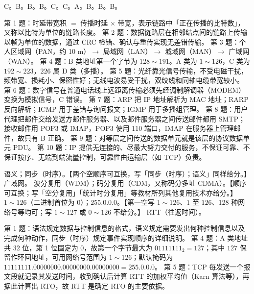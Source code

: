 \documentclass[a4paper,11pt]{article}
\begin{document}

\setcounter{question}{0}
\q C。\quad \q B。\quad \q B。\quad \q B。\quad \q C。\quad \q C。\quad \q A。\quad \q B。\quad \q B。\quad \q B。
\begin{analysis}
第 1 题：时延带宽积 \(=\) 传播时延 \(\times\) 带宽，表示链路中「正在传播的比特数」，又称以比特为单位的链路长度。
第 2 题：数据链路层在相邻结点间的链路上传输以帧为单位的数据，通过 CRC 检错、确认与重传实现无差错传输。
第 3 题：个人区域网（PAN，约 10 m）\(\rightarrow\) 局域网（LAN）\(\rightarrow\) 城域网（MAN）\(\rightarrow\) 广域网（WAN）。
第 4 题：B 类地址第一个字节为 \(128\sim191\)。A 类为 \(1\sim126\)，C 类为 \(192\sim223\)，\(226\) 属 D 类（多播）。
第 5 题：光纤靠光信号传输，不受电磁干扰，频带宽、损耗小、保密性好；无线电波易受干扰，双绞线和同轴电缆带宽较小。
第 6 题：数字信号在普通电话线上远距离传输必须先经调制解调器（MODEM）变换为模拟信号，C 错误。
第 7 题：ARP 把 IP 地址解析为 MAC 地址；RARP 反向解析；ICMP 用于差错与询问报文；IGMP 用于多播组管理。
第 8 题：用户代理把邮件交给发送方邮件服务器、以及邮件服务器之间传送邮件都用 SMTP；接收邮件用 POP3 或 IMAP，POP3 使用 110 端口，IMAP 在服务器上管理邮件，故只有 B 正确。
第 9 题：对等层之间传送的数据单元就是该层的协议数据单元 PDU。
第 10 题：IP 提供无连接的、尽最大努力交付的服务，不保证可靠、不保证按序、无端到端流量控制，可靠性由运输层（如 TCP）负责。
\end{analysis}

\setcounter{question}{0}
\q 语义；同步（时序）。【两个空顺序可互换，写「同步（时序）；语义」同样给分。】\quad
\q 广域网。\quad
\q 波分复用（WDM）；码分复用（CDM，又称码分多址 CDMA）。【顺序可互换；写「空分复用」「统计时分复用」等教材所列其他复用技术亦给分。】\quad
\q \(1\sim126\)（二进制首位为 0）；\(255.0.0.0\)。【第一空写 \(1\sim126\)、\(1\) 至 \(126\)、128 种网络号等均可；写 \(1\sim127\) 或 \(0\sim126\) 不给分。】\quad
\q RTT（往返时间）。
\begin{analysis}
第 1 题：语法规定数据与控制信息的格式，语义规定需要发出何种控制信息以及完成何种动作，同步（时序）规定事件实现顺序的详细说明。
第 4 题：A 类地址共 32 位，第 1 位固定为 0，故第一个字节最大为 \(01111111_2=127\)；其中 \(127\) 保留作环回地址，可用网络号范围为 \(1\sim126\)；默认掩码为 \(11111111.00000000.00000000.00000000=255.0.0.0\)。
第 5 题：TCP 每发送一个报文段就记录其发送时间，收到确认后计算 RTT 的加权平均值（Karn 算法等），再据此计算出 RTO，故 RTT 是确定 RTO 的主要依据。
\end{analysis}
\end{document}

